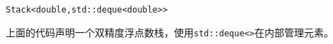 \begin{lstlisting}[style=styleCXX]
Stack<double,std::deque<double>>
\end{lstlisting}

上面的代码声明一个双精度浮点数栈，使用\texttt{std::deque<>}在内部管理元素。















